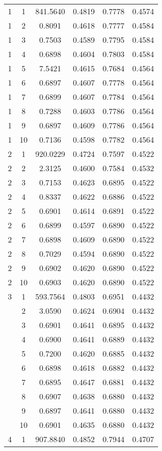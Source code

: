 \begin{longtable}{|c|c|c|c|c|c|}
1 & 1 & 841.5640 & 0.4819 & 0.7778 & 0.4574 \\
1 & 2 & 0.8091 & 0.4618 & 0.7777 & 0.4584 \\
1 & 3 & 0.7503 & 0.4589 & 0.7795 & 0.4584 \\
1 & 4 & 0.6898 & 0.4604 & 0.7803 & 0.4584 \\
1 & 5 & 7.5421 & 0.4615 & 0.7684 & 0.4564 \\
1 & 6 & 0.6897 & 0.4607 & 0.7778 & 0.4564 \\
1 & 7 & 0.6899 & 0.4607 & 0.7784 & 0.4564 \\
1 & 8 & 0.7288 & 0.4603 & 0.7786 & 0.4564 \\
1 & 9 & 0.6897 & 0.4609 & 0.7786 & 0.4564 \\
1 & 10 & 0.7136 & 0.4598 & 0.7782 & 0.4564 \\
\hline
2 & 1 & 920.0229 & 0.4724 & 0.7597 & 0.4522 \\
2 & 2 & 2.3125 & 0.4600 & 0.7584 & 0.4532 \\
2 & 3 & 0.7153 & 0.4623 & 0.6895 & 0.4522 \\
2 & 4 & 0.8337 & 0.4622 & 0.6886 & 0.4522 \\
2 & 5 & 0.6901 & 0.4614 & 0.6891 & 0.4522 \\
2 & 6 & 0.6899 & 0.4597 & 0.6890 & 0.4522 \\
2 & 7 & 0.6898 & 0.4609 & 0.6890 & 0.4522 \\
2 & 8 & 0.7029 & 0.4594 & 0.6890 & 0.4522 \\
2 & 9 & 0.6902 & 0.4620 & 0.6890 & 0.4522 \\
2 & 10 & 0.6903 & 0.4620 & 0.6890 & 0.4522 \\
\hline
3 & 1 & 593.7564 & 0.4803 & 0.6951 & 0.4432 \\
& 2 & 3.0590 & 0.4624 & 0.6904 & 0.4432 \\
& 3 & 0.6901 & 0.4641 & 0.6895 & 0.4432 \\
& 4 & 0.6900 & 0.4641 & 0.6889 & 0.4432 \\
& 5 & 0.7200 & 0.4620 & 0.6885 & 0.4432 \\
& 6 & 0.6898 & 0.4618 & 0.6882 & 0.4432 \\
& 7 & 0.6895 & 0.4647 & 0.6881 & 0.4432 \\
& 8 & 0.6907 & 0.4638 & 0.6880 & 0.4432 \\
& 9 & 0.6897 & 0.4641 & 0.6880 & 0.4432 \\
& 10 & 0.6901 & 0.4635 & 0.6880 & 0.4432 \\
\hline
4 & 1 & 907.8840 & 0.4852 & 0.7944 & 0.4707 \\

\end{longtable}
